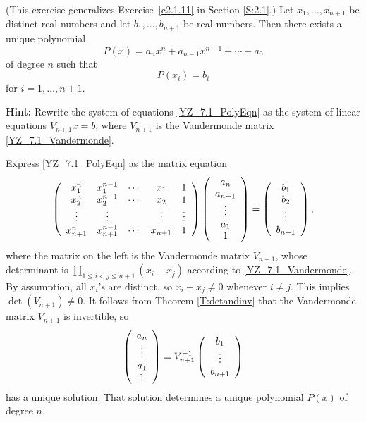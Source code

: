 \documentclass{ximera}
\begin{document}
\begin{exercise} \label{YZ_7.1_Polynomial_Interpolation}(This exercise generalizes Exercise~\ref{c2.1.11} in Section \ref{S:2.1}.)
Let $x_1,\ldots,x_{n+1}$ be distinct real numbers and let $b_1,\ldots, b_{n+1}$ be real numbers. Then 
there exists a unique polynomial 
\[
P(x)=a_nx^n+a_{n-1}x^{n-1}+\cdots+a_0
\]
of degree $n$ such that 
\begin{equation} \label{YZ_7.1_PolyEqn}
    P(x_i)=b_i
\end{equation}
for $i=1,\ldots, n+1$.

{\bf Hint:} Rewrite the system of equations \eqref{YZ_7.1_PolyEqn} as the system of linear equations $V_{n+1} x = b$, where $V_{n+1}$ is the Vandermonde matrix \eqref{YZ_7.1_Vandermonde}.
\begin{solution}

\soln 

Express \eqref{YZ_7.1_PolyEqn} as the matrix equation
\[
\left(\begin{array}{cccccccccccc} x_1^n &x_1^{n-1}&\cdots&x_1&1\\
x_2^n &x_2^{n-1}&\cdots&x_2&1\\
\vdots&\vdots & & \vdots &\vdots\\
x_{n+1}^n &x_{n+1}^{n-1}&\cdots&x_{n+1}&1\\ \end{array}\right)\left(\begin{array}{cccccccccccc} a_n\\a_{n-1}\\ \vdots\\ a_1\\1 \end{array}\right)=\left(\begin{array}{cccccccccccc} b_1 \\ b_2 \\ \vdots\\b_{n+1} \end{array}\right),
\]
where the matrix on the left is the Vandermonde matrix $V_{n+1}$, whose determinant is $\prod_{1\le i<j\le n+1}(x_i-x_j)$ according to \eqref{YZ_7.1_Vandermonde}. By assumption, all $x_i$'s are distinct, so $x_i-x_j\neq 0$ whenever $i\neq j$. This implies $\det(V_{n+1})\neq 0$. 
It follows from Theorem \ref{T:detandinv} that the Vandermonde matrix $V_{n+1}$ is invertible, so  
\[
\left(\begin{array}{cccccccccccc} a_n\\ \vdots \\ a_1 \\1 \end{array}\right)=V_{n+1}^{-1}\left(\begin{array}{cccccccccccc} b_1\\ \vdots\\b_{n+1} \end{array}\right)
\]
has a unique solution. That solution determines a unique polynomial $P(x)$ of degree $n$.

\end{solution}
\end{exercise}
\end{document}
